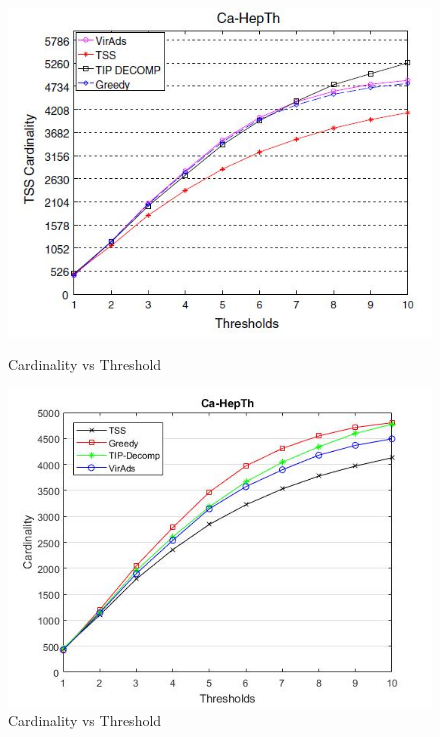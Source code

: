 \begin{figure}[h!]
\begin{minipage}[t]{0.50\textwidth}
\includegraphics[width=\linewidth,keepaspectratio=true]{images/ca-hepthpaper.jpg}
\caption{Cardinality vs Threshold}
\label{fase1}
\end{minipage}
\begin{minipage}[t]{0.50\textwidth}
\includegraphics[width=\linewidth,keepaspectratio=true]{images/ca-hepthresult.jpg}
\caption{Cardinality vs Threshold}
\end{minipage}
\end{figure}

